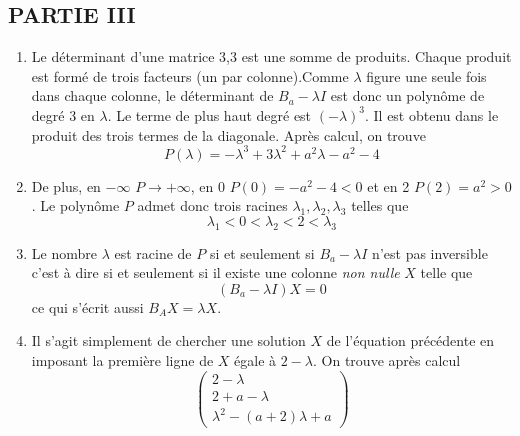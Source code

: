 \subsection*{PARTIE III}
\begin{enumerate}
\item Le déterminant d'une matrice 3,3 est une somme de produits. Chaque produit est formé de trois facteurs (un par colonne).Comme $\lambda$ figure une seule fois dans chaque colonne, le déterminant de $B_{a}-\lambda I$ est donc un polynôme de degré 3 en $\lambda$. Le terme de plus haut degré est $(-\lambda)^{3}$. Il est obtenu dans le produit des trois termes de la diagonale.
\newline Après calcul, on trouve
\[P(\lambda)=-\lambda^{3}+3\lambda^{2}+a^{2}\lambda-a^{2}-4\]
\item De plus, en $-\infty$ $P\rightarrow +\infty$, en 0 $P(0)=-a^{2}-4<0$ et en 2 $P(2)=a^{2}>0$. Le polynôme $P$ admet donc trois racines $\lambda_{1},\lambda_{2},\lambda_{3}$ telles que 
\[\lambda_{1}<0<\lambda_{2}<2<\lambda_{3}\]
\item Le nombre $\lambda$ est racine de $P$ si et seulement si $B_{a}-\lambda I$ n'est pas inversible c'est à dire si et seulement si il existe une colonne \emph{non nulle} $X$ telle que
\[(B_{a}-\lambda I)X=0\] ce qui s'écrit aussi $B_{A}X=\lambda X$.
\item Il s'agit simplement de chercher une solution $X$ de l'équation précédente en imposant la première ligne de $X$ égale à $2-\lambda$. On trouve après calcul
\[\left (
\begin{array}{c}
 2-\lambda\\
2+a-\lambda \\
\lambda^{2}-(a+2)\lambda+a
\end{array}
\right )
\]
\end{enumerate}
